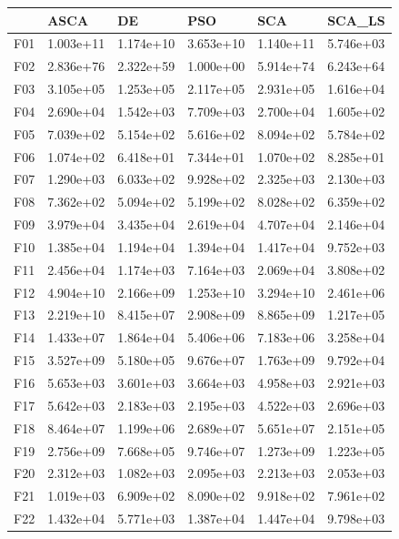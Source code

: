 \begin{tabular}{llllll}
\toprule
{} &       ASCA &         DE &        PSO &        SCA &     SCA\_LS \\
\midrule
F01  &  1.003e+11 &  1.174e+10 &  3.653e+10 &  1.140e+11 &  5.746e+03 \\
F02  &  2.836e+76 &  2.322e+59 &  1.000e+00 &  5.914e+74 &  6.243e+64 \\
F03  &  3.105e+05 &  1.253e+05 &  2.117e+05 &  2.931e+05 &  1.616e+04 \\
F04  &  2.690e+04 &  1.542e+03 &  7.709e+03 &  2.700e+04 &  1.605e+02 \\
F05  &  7.039e+02 &  5.154e+02 &  5.616e+02 &  8.094e+02 &  5.784e+02 \\
F06  &  1.074e+02 &  6.418e+01 &  7.344e+01 &  1.070e+02 &  8.285e+01 \\
F07  &  1.290e+03 &  6.033e+02 &  9.928e+02 &  2.325e+03 &  2.130e+03 \\
F08  &  7.362e+02 &  5.094e+02 &  5.199e+02 &  8.028e+02 &  6.359e+02 \\
F09  &  3.979e+04 &  3.435e+04 &  2.619e+04 &  4.707e+04 &  2.146e+04 \\
F10  &  1.385e+04 &  1.194e+04 &  1.394e+04 &  1.417e+04 &  9.752e+03 \\
F11  &  2.456e+04 &  1.174e+03 &  7.164e+03 &  2.069e+04 &  3.808e+02 \\
F12  &  4.904e+10 &  2.166e+09 &  1.253e+10 &  3.294e+10 &  2.461e+06 \\
F13  &  2.219e+10 &  8.415e+07 &  2.908e+09 &  8.865e+09 &  1.217e+05 \\
F14  &  1.433e+07 &  1.864e+04 &  5.406e+06 &  7.183e+06 &  3.258e+04 \\
F15  &  3.527e+09 &  5.180e+05 &  9.676e+07 &  1.763e+09 &  9.792e+04 \\
F16  &  5.653e+03 &  3.601e+03 &  3.664e+03 &  4.958e+03 &  2.921e+03 \\
F17  &  5.642e+03 &  2.183e+03 &  2.195e+03 &  4.522e+03 &  2.696e+03 \\
F18  &  8.464e+07 &  1.199e+06 &  2.689e+07 &  5.651e+07 &  2.151e+05 \\
F19  &  2.756e+09 &  7.668e+05 &  9.746e+07 &  1.273e+09 &  1.223e+05 \\
F20  &  2.312e+03 &  1.082e+03 &  2.095e+03 &  2.213e+03 &  2.053e+03 \\
F21  &  1.019e+03 &  6.909e+02 &  8.090e+02 &  9.918e+02 &  7.961e+02 \\
F22  &  1.432e+04 &  5.771e+03 &  1.387e+04 &  1.447e+04 &  9.798e+03 \\

\end{tabular}
